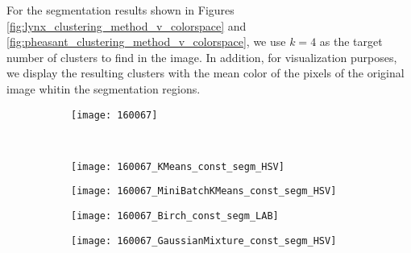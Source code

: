 For the segmentation results shown in Figures \ref{fig:lynx_clustering_method_v_colorspace} and \ref{fig:pheasant_clustering_method_v_colorspace}, we use $k = 4$ as the target number of clusters to find in the image. In addition, for visualization purposes, we display the resulting clusters with the mean color of the pixels of the original image whitin the segmentation regions. 

\begin{figure}[!ht]
         
    \begin{subfigure}[b]{\textwidth+20pt\relax}
    	\centering
    	\texttt{[image: 160067]} 
    \end{subfigure}  \\ \vspace{-5pt}    
    
    
    \begin{subfigure}[b]{\textwidth+20pt\relax}
    	\centering
    	\texttt{[image: 160067\_KMeans\_const\_segm\_HSV]} 
    \end{subfigure}      
    \begin{subfigure}[b]{0.23\textwidth}
    	\centering
        \texttt{[image: 160067\_MiniBatchKMeans\_const\_segm\_HSV]}
    \end{subfigure}
    \begin{subfigure}[b]{0.23\textwidth}
    	\centering
        \texttt{[image: 160067\_Birch\_const\_segm\_LAB]}
    \end{subfigure}
    \begin{subfigure}[b]{0.23\textwidth}
    	\centering
        \texttt{[image: 160067\_GaussianMixture\_const\_segm\_HSV]}
    \end{subfigure} \\ \vspace{-5pt}  
    

\end{figure}
